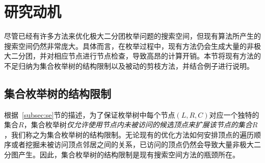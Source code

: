 
    


\section{研究动机}
\label{sec:ambea_motivation}

尽管已经有许多方法来优化极大二分团枚举问题的搜索空间，但现有算法所产生的搜索空间仍然非常庞大。具体而言，在枚举过程中，现有方法仍会生成大量的非极大二分团，并对相应节点进行节点检查，导致高昂的计算开销。本节将现有方法的不足归纳为集合枚举树的结构限制以及被动的剪枝方法，并结合例子进行说明。


\subsection{集合枚举树的结构限制}

根据~\ref{subsec:se}节的描述，为了保证枚举树中每个节点$(L,R,C)$对应一个独特的集合$R$，集合枚举树\emph{仅允许使用节点内未被访问的候选顶点来扩展该节点的集合$R$}，我们称之为集合枚举树的结构限制。无论现有的优化方法如何安排顶点的遍历顺序或者挖掘未被访问顶点邻居之间的关系，已访问的顶点仍然会导致大量非极大二分图产生。因此，集合枚举树的结构限制是现有搜索空间方法的瓶颈所在。

